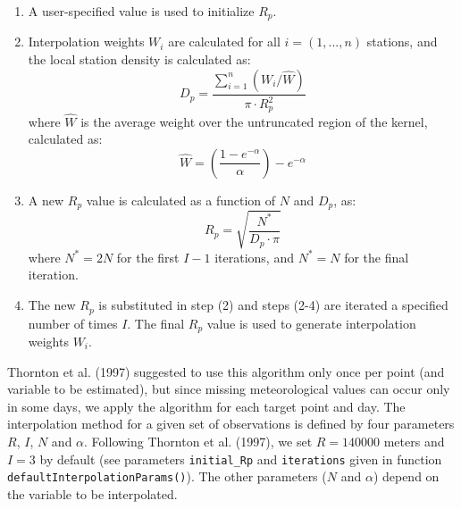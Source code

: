 \documentclass[11pt,a4paper]{article}
\begin{document}
\begin{enumerate}
\item{A user-specified value is used to initialize $R_p$.}
\item{Interpolation weights $W_i$ are calculated for all $i = (1, ..., n)$ stations, and the local station density is calculated as:
\begin{equation}
D_p = \frac{\sum_{i=1}^{n}{(W_i/\hat{W})}}{\pi \cdot R_p^2}
\end{equation}
where $\hat{W}$ is the average weight over the untruncated region of the kernel, calculated as:
\begin{equation}
\hat{W} = \left( \frac{1 - e^{-\alpha}}{\alpha}\right)- e^{-\alpha}
\end{equation}
}
\item{A new $R_p$ value is calculated as a function of $N$ and $D_p$, as:
\begin{equation}
R_p = \sqrt{\frac{N^*}{D_p \cdot \pi}}
\end{equation}
where $N^* = 2N$ for the first $I - 1$ iterations, and $N^* = N$ for the final iteration.
}
\item{ The new $R_p$ is substituted in step (2) and steps (2-4) are iterated a specified number of times $I$. The final $R_p$ value is used to generate interpolation weights $W_i$.}
\end{enumerate}
Thornton et al. (1997) suggested to use this algorithm only once per point (and variable to be estimated), but since missing meteorological values can occur only in some days, we apply the algorithm for each target point and day. The interpolation method for a given set of observations is defined by four parameters $R$, $I$, $N$ and $\alpha$. Following Thornton et al. (1997), we set $R = 140000$ meters and $I = 3$ by default (see parameters \texttt{initial\_Rp} and \texttt{iterations} given in function \texttt{defaultInterpolationParams()}). The other parameters ($N$ and $\alpha$) depend on the variable to be interpolated.
\end{document}

